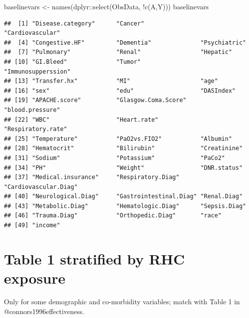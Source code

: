 \documentclass[
]{book}
\newenvironment{Shaded}{\begin{snugshade}}{\end{snugshade}}
\newcommand{\FunctionTok}[1]{\textcolor[rgb]{0.00,0.00,0.00}{#1}}
\newcommand{\NormalTok}[1]{#1}
\newcommand{\OtherTok}[1]{\textcolor[rgb]{0.56,0.35,0.01}{#1}}
\newcommand{\SpecialCharTok}[1]{\textcolor[rgb]{0.00,0.00,0.00}{#1}}
\begin{document}
\begin{Shaded}
\begin{Highlighting}[]
\NormalTok{baselinevars }\OtherTok{\textless{}{-}} \FunctionTok{names}\NormalTok{(dplyr}\SpecialCharTok{::}\FunctionTok{select}\NormalTok{(ObsData, }
                         \SpecialCharTok{!}\FunctionTok{c}\NormalTok{(A,Y)))}
\NormalTok{baselinevars}
\end{Highlighting}
\end{Shaded}

\begin{verbatim}
##  [1] "Disease.category"      "Cancer"                "Cardiovascular"       
##  [4] "Congestive.HF"         "Dementia"              "Psychiatric"          
##  [7] "Pulmonary"             "Renal"                 "Hepatic"              
## [10] "GI.Bleed"              "Tumor"                 "Immunosupperssion"    
## [13] "Transfer.hx"           "MI"                    "age"                  
## [16] "sex"                   "edu"                   "DASIndex"             
## [19] "APACHE.score"          "Glasgow.Coma.Score"    "blood.pressure"       
## [22] "WBC"                   "Heart.rate"            "Respiratory.rate"     
## [25] "Temperature"           "PaO2vs.FIO2"           "Albumin"              
## [28] "Hematocrit"            "Bilirubin"             "Creatinine"           
## [31] "Sodium"                "Potassium"             "PaCo2"                
## [34] "PH"                    "Weight"                "DNR.status"           
## [37] "Medical.insurance"     "Respiratory.Diag"      "Cardiovascular.Diag"  
## [40] "Neurological.Diag"     "Gastrointestinal.Diag" "Renal.Diag"           
## [43] "Metabolic.Diag"        "Hematologic.Diag"      "Sepsis.Diag"          
## [46] "Trauma.Diag"           "Orthopedic.Diag"       "race"                 
## [49] "income"
\end{verbatim}

\hypertarget{table-1-stratified-by-rhc-exposure}{%
\section{Table 1 stratified by RHC exposure}\label{table-1-stratified-by-rhc-exposure}}

\begin{rmdcomment}
Only for some demographic and co-morbidity variables; match with Table 1
in @connors1996effectiveness.
\end{rmdcomment}
\end{document}
